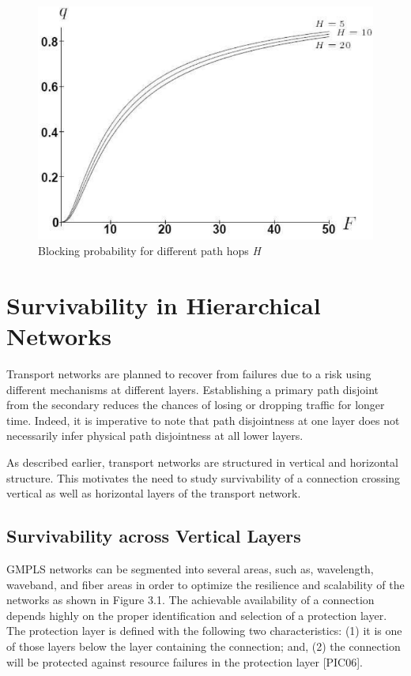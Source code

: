 %
\begin{figure}
\centering \includegraphics[clip]{Figures/util1} 

\caption{Blocking probability for different path hops \emph{H}}


\label{fig:Utilization} 
\end{figure}



\section{Survivability in Hierarchical Networks}

Transport networks are planned to recover from failures due to a risk
using different mechanisms at different layers. Establishing a primary
path disjoint from the secondary reduces the chances of losing or
dropping traffic for longer time. Indeed, it is imperative to note
that path disjointness at one layer does not necessarily infer physical
path disjointness at all lower layers.

As described earlier, transport networks are structured in vertical
and horizontal structure. This motivates the need to study survivability
of a connection crossing vertical as well as horizontal layers of
the transport network.


\subsection{Survivability across Vertical Layers}

GMPLS networks can be segmented into several areas, such as, wavelength,
waveband, and fiber areas in order to optimize the resilience and
scalability of the networks as shown in Figure 3.1. The achievable
availability of a connection depends highly on the proper identification
and selection of a protection layer. The protection layer is defined
with the following two characteristics: (1) it is one of those layers
below the layer containing the connection; and, (2) the connection
will be protected against resource failures in the protection layer
{[}PIC06].


